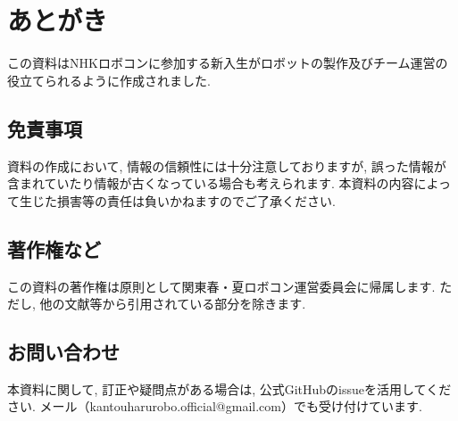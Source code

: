 \chapter*{あとがき}
この資料はNHKロボコンに参加する新入生がロボットの製作及びチーム運営の役立てられるように作成されました. 

\section*{免責事項}
資料の作成において, 情報の信頼性には十分注意しておりますが, 誤った情報が含まれていたり情報が古くなっている場合も考えられます. 
本資料の内容によって生じた損害等の責任は負いかねますのでご了承ください. 

\section*{著作権など}
この資料の著作権は原則として関東春・夏ロボコン運営委員会に帰属します. ただし, 他の文献等から引用されている部分を除きます. 

\section*{お問い合わせ}
本資料に関して, 訂正や疑問点がある場合は, 公式GitHubのissueを活用してください. メール（kantouharurobo.official@gmail.com）でも受け付けています.
